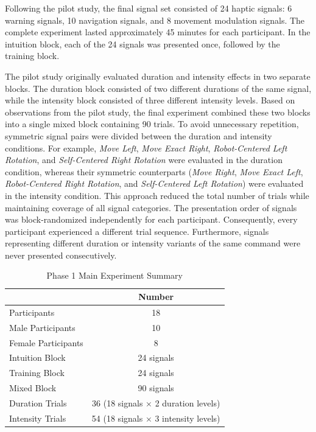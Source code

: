 \documentclass[12pt]{report}
\begin{document}
Following the pilot study, the final signal set consisted of 24 haptic signals: 6 warning signals, 10 navigation signals, and 8 movement modulation signals. The complete experiment lasted approximately 45 minutes for each participant. In the intuition block, each of the 24 signals was presented once, followed by the training block.

The pilot study originally evaluated duration and intensity effects in two separate blocks. The duration block consisted of two different durations of the same signal, while the intensity block consisted of three different intensity levels. Based on observations from the pilot study, the final experiment combined these two blocks into a single mixed block containing 90 trials. To avoid unnecessary repetition, symmetric signal pairs were divided between the duration and intensity conditions. For example, \textit{Move Left}, \textit{Move Exact Right}, \textit{Robot-Centered Left Rotation}, and \textit{Self-Centered Right Rotation} were evaluated in the duration condition, whereas their symmetric counterparts (\textit{Move Right}, \textit{Move Exact Left}, \textit{Robot-Centered Right Rotation}, and \textit{Self-Centered Left Rotation}) were evaluated in the intensity condition. This approach reduced the total number of trials while maintaining coverage of all signal categories. The presentation order of signals was block-randomized independently for each participant. Consequently, every participant experienced a different trial sequence. Furthermore, signals representing different duration or intensity variants of the same command were never presented consecutively.

\begin{table}[H]
\centering
\caption{Phase 1 Main Experiment Summary}
\label{tab:phase1_summary}
\begin{tabular}{lc}
\hline
\textbf{} & \textbf{Number} \\
\hline
Participants & 18 \\
Male Participants & 10 \\
Female Participants & 8 \\
\hline
Intuition Block & 24 signals \\
Training Block & 24 signals \\
Mixed Block & 90 signals \\
Duration Trials & 36 (18 signals $\times$ 2 duration levels) \\
Intensity Trials & 54 (18 signals $\times$ 3 intensity levels) \\
\hline
\end{tabular}
\end{table}
\end{document}
